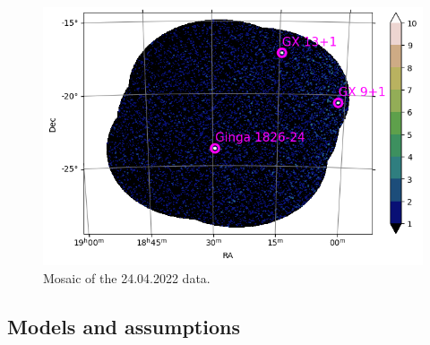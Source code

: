         \begin{figure}[H]
        \centering
        \includegraphics[width = 12cm]{report/Figures/methods/2404/oda_2404.png}
        \caption{Mosaic of the 24.04.2022 data.}
        \label{24_mosaic}
        \end{figure}

    
    \subsection{Models and assumptions}

